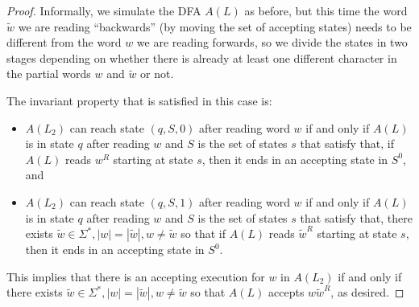 \begin{proof}
Informally, we simulate the DFA $A(L)$ as before, but this time the word $\tilde{w}$ we are reading ``backwards'' (by moving the set of 
accepting states) needs to be different from the word $w$ we are reading forwards, so we divide the states in two stages depending on 
whether there is already at least one different character in the partial words $w$ and $\tilde{w}$ or not. 

The invariant property that is satisfied in this case is:

\begin{itemize}
    \item  $A(L_2)$ can reach state $(q, S, 0)$ after reading word $w$ if and only if
    $A(L)$ is in state $q$ after reading $w$ and $S$ is the set of states $s$ that satisfy that, if $A(L)$ reads $w^R$ starting at state $s$,
    then it ends in an accepting state in $S^0$, and
    \item $A(L_2)$ can reach state $(q, S, 1)$ after reading word $w$ if and only if
    $A(L)$ is in state $q$ after reading $w$ and $S$ is the set of states $s$ that satisfy that, 
    there exists $\tilde{w} \in \Sigma^*, |w| = |\tilde{w}|, w \neq \tilde{w}$ so that if $A(L)$ reads $\tilde{w}^R$ starting at state $s$,
    then it ends in an accepting state in $S^0$.
\end{itemize}

This implies that there is an accepting execution for $w$ in $A(L_2)$ if and only if there exists
$\tilde{w} \in \Sigma^*, |w| = |\tilde{w}|, w \neq \tilde{w}$ so that $A(L)$ accepts $w\tilde{w}^R$, as desired. 


\end{proof}


